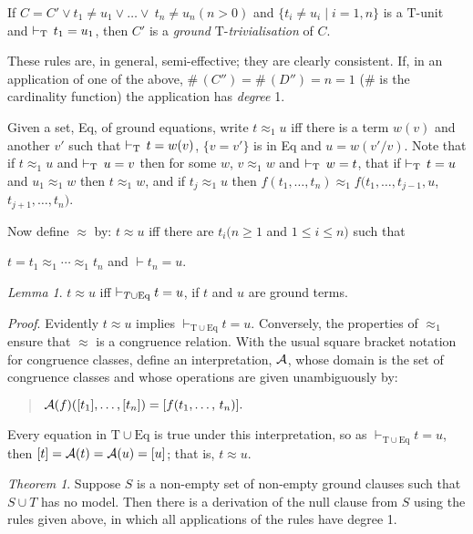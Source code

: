 \documentclass[letterpaper]{report}
\begin{document}
If
$C=C'\lor t_{1}\neq u_{1}\lor\ldots\lor\ t_{n}\neq u_{n}(n>0)$
and $\{t_{i}\neq u_{i}\mid i=1,n\}$ is a $\mathrm{T}$-unit and
$\vdash_{\rm T}\,t_{1}=u_{1}$, then $C'$ is a \emph{ground}
$\mathrm{T}$-\emph{trivialisation} of $C$.

These rules are, in general, semi-effective; they are clearly
consistent. If, in an application of one of the above,
$\#\,(C'')=\#\,(D'')=n=1$ ($\#$ is the
cardinality function) the application has \emph{degree} 1.

Given a set, Eq, of ground equations, write $t\approx_{1}u$ iff there
is a term $w(v)$ and another $v'$ such that
$\vdash_{\rm T}\,t=w(v)$, $\{v=v'\}$ is in Eq and
$u=w(v'/v)$. Note that if $t\approx_{1}u$ and
$\vdash_{\rm T}\,u=v$ then for some $w$, $v\approx_{1}w$ and
$\vdash_{\rm T}\,w=t$, that if $\vdash_{\rm T}\,t=u$ and
$u_{1}\approx_{1}w$ then $t\approx_{1}w$, and if
$t_{j}\approx_{1}u$ then
$f(t_{1},\ldots,t_{n})\approx_{1}f(t_{1},\ldots,$$t_{j-1},u$,
$t_{j+1},\ldots,$$t_{n})$.

Now define $\approx$ by: $t\approx u$ iff there are
$t_{i}(n\geqslant 1$ and $1\leqslant i\leqslant n)$ such that

$t=t_{1}\approx_{1}\cdots\approx_{1}t_{n}$ and $\vdash t_{n}=u$.

\noindent
\emph{Lemma 1}. $t \approx u$ iff
$\vdash_{T\cup\mbox{\scriptsize Eq}}t = u$, if $t$ and $u$ are
ground terms.

\noindent
\emph{Proof}. Evidently $t \approx u$ implies
$\vdash_{\mathrm{T} \cup \mathrm{Eq}}t = u$. Conversely, the
properties of $\approx_{1}$ ensure that $\approx$ is a congruence
relation. With the usual square bracket notation for congruence classes,
define an interpretation, $\cal A$, whose domain is the set of
congruence classes and whose operations are given unambiguously by:
\begin{quote}
${\cal A}(f)([t_{1}],\ldots,[t_{n}]) = [f(t_{1},\ldots,\,t_{n})].$
\end{quote}

Every equation in $\mathrm{T}\cup \mathrm{Eq}$ is true under this
interpretation, so as $\vdash_{\mathrm{T} \cup \mathrm{Eq}} t = u$,
then $[t] = {\cal A}(t) = {\cal A}(u) = [u]$; that is,
$t \approx u$.

\noindent
\emph{Theorem 1}. Suppose $S$ is a non-empty set of non-empty ground
clauses such that $S\cup T$ has no model. Then there is a derivation
of the null clause from $S$ using the rules given above, in which all
applications of the rules have degree 1.
\end{document}
